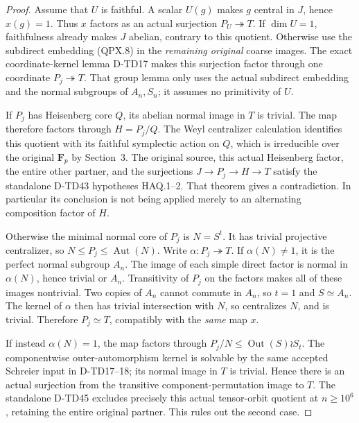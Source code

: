 \begin{proof}
Assume that \(U\) is faithful. A scalar \(U(g)\) makes \(g\)
central in \(J\), hence \(x(g)=1\). Thus \(x\) factors as
an actual surjection \(P_U\twoheadrightarrow T\).
If \(\dim U=1\), faithfulness already makes \(J\) abelian,
contrary to this quotient. Otherwise use the subdirect
embedding (QPX.8) in the \emph{remaining original} coarse
images. The exact coordinate-kernel lemma D-TD17 makes this
surjection factor through one coordinate \(P_j\twoheadrightarrow T\).
That group lemma only uses the actual subdirect embedding
and the normal subgroups of \(A_n,S_n\); it assumes no
primitivity of \(U\).

If \(P_j\) has Heisenberg core \(Q\), its abelian normal
image in \(T\) is trivial. The map therefore factors
through \(H=P_j/Q\). The Weyl centralizer calculation
identifies this quotient with its faithful symplectic action
on \(Q\), which is irreducible over the original
\(\mathbf F_p\) by Section~3. The original source, this
actual Heisenberg factor, the entire other partner, and
the surjections \(J\to P_j\to H\to T\) satisfy the standalone
D-TD43 hypotheses HAQ.1--2. That theorem gives a contradiction.
In particular its conclusion is not being applied merely
to an alternating composition factor of \(H\).

Otherwise the minimal normal core of \(P_j\) is \(N=S^t\).
It has trivial projective centralizer, so
\(N\le P_j\le\operatorname{Aut}(N)\).
Write \(\alpha:P_j\twoheadrightarrow T\).
If \(\alpha(N)\ne1\), it is the perfect normal subgroup
\(A_n\). The image of each simple direct factor is normal
in \(\alpha(N)\), hence trivial or \(A_n\). Transitivity
of \(P_j\) on the factors makes all of these images
nontrivial. Two copies of \(A_n\) cannot commute in
\(A_n\), so \(t=1\) and \(S\simeq A_n\).
The kernel of \(\alpha\) then has trivial intersection
with \(N\), so centralizes \(N\), and is trivial. Therefore
\(P_j\simeq T\), compatibly with the \emph{same} map \(x\).

If instead \(\alpha(N)=1\), the map factors through
\(P_j/N\le\operatorname{Out}(S)\wr S_t\).
The componentwise outer-automorphism kernel is solvable
by the same accepted Schreier input in D-TD17--18; its
normal image in \(T\) is trivial. Hence there is an actual
surjection from the transitive component-permutation image
to \(T\). The standalone D-TD45 excludes precisely this
actual tensor-orbit quotient at \(n\ge10^6\), retaining
the entire original partner. This rules out the second case.


\end{proof}
